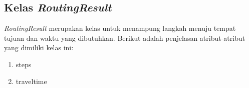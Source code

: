 \subsection{Kelas \textit{RoutingResult}}
\label{lab:Kelas RoutingResult}
\hspace{0.5cm} \textit{RoutingResult} merupakan kelas untuk menampung langkah menuju tempat tujuan dan waktu yang dibutuhkan. Berikut adalah penjelasan atribut-atribut yang dimiliki kelas ini:
\begin{enumerate}
	\item steps
	\item traveltime
\end{enumerate}


